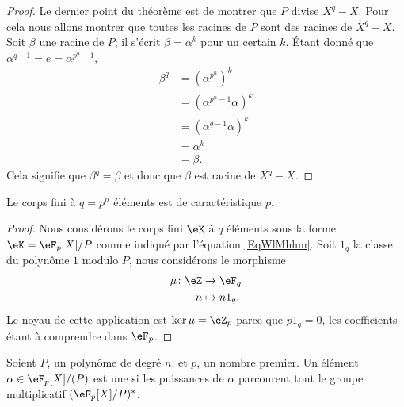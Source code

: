 \begin{proof}
	Le dernier point du théorème est de montrer que \( P\) divise \( X^q-X\). Pour cela nous allons montrer que toutes les racines de \( P\) sont des racines de \( X^q-X\). Soit \( \beta\) une racine de \( P\); il s'écrit \( \beta=\alpha^k\) pour un certain \( k\). Étant donné que \( \alpha^{q-1}=e=\alpha^{p^n-1}\),
	\begin{subequations}
		\begin{align}
			\beta^q & =(\alpha^{p^n})^k                      \\
			        & =\left( \alpha^{p^n-1}\alpha \right)^k \\
			        & =\left( \alpha^{q-1}\alpha \right)^k   \\
			        & =\alpha^k                              \\
			        & =\beta.
		\end{align}
	\end{subequations}
	Cela signifie que \( \beta^q=\beta\) et donc que \( \beta\) est racine de \( X^q-X\).
\end{proof}

\begin{corollary}
	Le corps fini à \( q=p^n\) éléments est de caractéristique \( p\).
\end{corollary}

\begin{proof}
	Nous considérons le corps fini \( \eK\) à \( q\) éléments sous la forme \( \eK=\eF_p[X]/P\) comme indiqué par l'équation \eqref{EqWlMhhm}. Soit \( 1_q\) la classe du polynôme \( 1\) modulo \( P\), nous considérons le morphisme
	\begin{equation}
		\begin{aligned}
			\mu\colon \eZ & \to \eF_q     \\
			n             & \mapsto n1_q.
		\end{aligned}
	\end{equation}
	Le noyau de cette application est \( \ker\mu=\eZ_p\) parce que \( p1_q=0\), les coefficients étant à comprendre dans \( \eF_p\).
\end{proof}

\begin{definition}  \label{DefnPNCFO}
	Soient \( P\), un polynôme de degré \( n\), et \( p\), un nombre premier. Un élément \( \alpha\in \eF_p[X]/(P)\) est une  si les puissances de \( \alpha\) parcourent tout le groupe multiplicatif \( (\eF_p[X]/P)^*\).
\end{definition}

